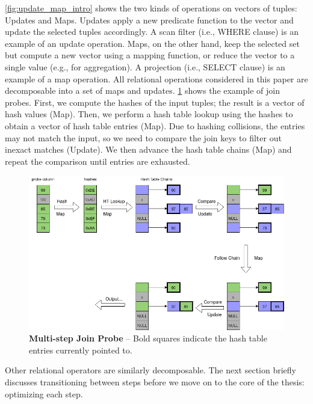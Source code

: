 \documentclass[12pt]{cmuthesis}
\begin{document}
\cref{fig:update_map_intro} shows the two kinds of operations on vectors of tuples: Updates and Maps. Updates apply a new predicate function to the vector and update the selected tuples accordingly. A scan filter (i.e., WHERE clause) is an example of an update operation. Maps, on the other hand, keep the selected set but compute a new vector using a mapping function, or reduce the vector to a single value (e.g., for aggregation). A projection (i.e., SELECT clause) is an example of a map operation. All relational operations considered in this paper are decomposable into a set of maps and updates. \cref{fig:probe_example} shows the example of join probes. First, we compute the hashes of the input tuples; the result is a vector of hash values (Map). Then, we perform a hash table lookup using the hashes to obtain a vector of hash table entries (Map). Due to hashing collisions, the entries may not match the input, so we need to compare the join keys to filter out inexact matches (Update). We then advance the hash table chains (Map) and repeat the comparison until entries are exhausted.

\begin{figure}[t!]
    \centering
    \includegraphics[scale=0.5]{images/JoinProbeExample.png}
    \caption{\textbf{Multi-step Join Probe} -- Bold squares indicate the hash table entries currently pointed to.}
    \label{fig:probe_example}
\end{figure}

Other relational operators are similarly decomposable. The next section briefly discusses transitioning between steps before we move on to the core of the thesis: optimizing each step. 
\end{document}
